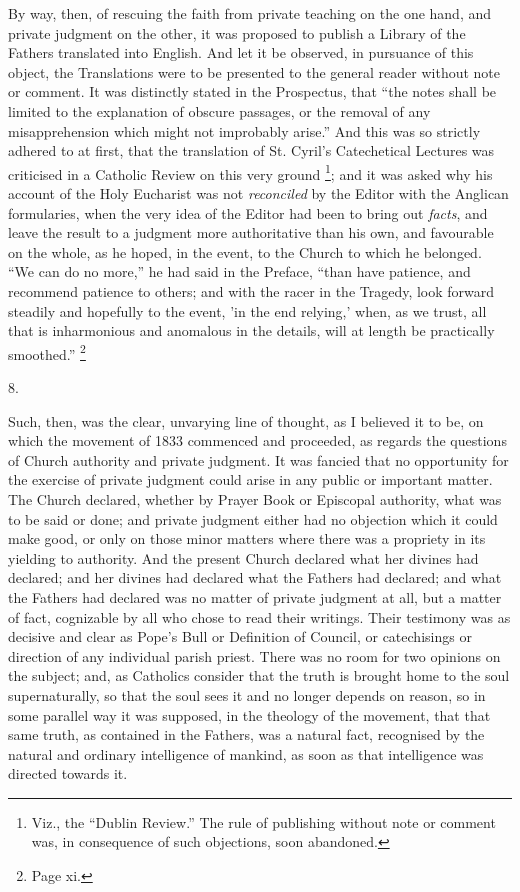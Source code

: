 By way, then, of rescuing the faith from private teaching on the
one hand, and private judgment on the other, it was proposed to
publish a Library of the Fathers translated into English. And let it
be observed, in pursuance of this object, the Translations were to be
presented to the general reader without note or comment. It was
distinctly stated in the Prospectus, that ``the notes shall be
limited to the explanation of obscure passages, or the removal of any
misapprehension which might not improbably arise.'' And this was
so strictly adhered to at first, that the translation of St. Cyril's
Catechetical Lectures was criticised in a Catholic Review on this very
ground \footnote{Viz., the ``Dublin Review.'' The
rule of publishing without note or comment was, in consequence of such
objections, soon abandoned.}; and it was
asked why his account of the Holy Eucharist was not \emph{reconciled}
by the Editor with the Anglican formularies, when the very idea of the
Editor had been to bring out \emph{facts}, and leave the result to a
judgment more authoritative than his own, and favourable on the whole,
as he hoped, in the event, to the Church to which he belonged.
``We can do no more,'' he had said in the Preface, ``than
have patience, and recommend patience to others; and with the racer in
the Tragedy, look forward steadily and hopefully to the event, 'in the
end relying,' when, as we trust, all that is inharmonious and
anomalous in the details, will at length be practically
smoothed.'' \footnote{Page xi.}

8.

Such, then, was the clear, unvarying line of thought, as I believed
it to be, on which the movement of 1833 commenced and proceeded, as
regards the questions of Church authority and private judgment. It was
fancied that no opportunity for the exercise of private judgment could
arise in any public or important matter. The Church declared, whether
by Prayer Book or Episcopal authority, what was to be said or done;
and private judgment either had no objection which it could make good,
or only on those minor matters where there was a propriety in its
yielding to authority. And the present Church declared what her
divines had declared; and her divines had declared what the Fathers
had declared; and what the Fathers had declared was no matter of
private judgment at all, but a matter of fact, cognizable by all who
chose to read their writings. Their testimony was as decisive and
clear as Pope's Bull or Definition of Council, or catechisings or
direction of any individual parish priest. There was no room for two
opinions on the subject; and, as Catholics consider that the truth is
brought home to the soul supernaturally, so that the soul sees it and
no longer depends on reason, so in some parallel way it was supposed,
in the theology of the movement, that that same truth, as contained in
the Fathers, was a natural fact, recognised by the natural and
ordinary intelligence of mankind, as soon as that intelligence was
directed towards it.

